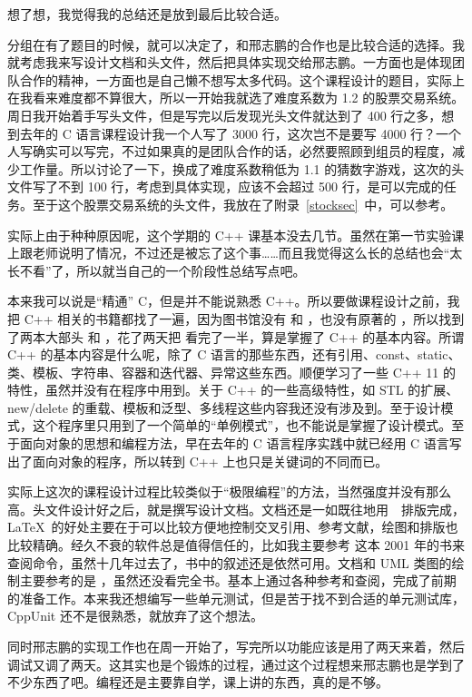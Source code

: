想了想，我觉得我的总结还是放到最后比较合适。

分组在有了题目的时候，就可以决定了，和邢志鹏的合作也是比较合适的选择。我就考虑我来写设计文档和头文件，然后把具体实现交给邢志鹏。一方面也是体现团队合作的精神，一方面也是自己懒不想写太多代码。这个课程设计的题目，实际上在我看来难度都不算很大，所以一开始我就选了难度系数为 1.2 的股票交易系统。周日我开始着手写头文件，但是写完以后发现光头文件就达到了 400 行之多，想到去年的 C 语言课程设计我一个人写了 3000 行，这次岂不是要写 4000 行？一个人写确实可以写完，不过如果真的是团队合作的话，必然要照顾到组员的程度，减少工作量。所以讨论了一下，换成了难度系数稍低为 1.1 的猜数字游戏，这次的头文件写了不到 100 行，考虑到具体实现，应该不会超过 500 行，是可以完成的任务。至于这个股票交易系统的头文件，我放在了附录~\ref{stocksec}~中，可以参考。

实际上由于种种原因呢，这个学期的 C++ 课基本没去几节。虽然在第一节实验课上跟老师说明了情况，不过还是被忘了这个事……而且我觉得这么长的总结也会“太长不看”了，所以就当自己的一个阶段性总结写点吧。

本来我可以说是“精通” C，但是并不能说熟悉 C++。所以要做课程设计之前，我把 C++ 相关的书籍都找了一遍，因为图书馆没有 \cite{cppp} 和 \cite{cpppp}，也没有原著的 \cite{cpplang}，所以找到了两本大部头 \cite{proc_c} 和 \cite{vc_c}，花了两天把 \cite{proc_c} 看完了一半，算是掌握了 C++ 的基本内容。所谓 C++ 的基本内容是什么呢，除了 C 语言的那些东西，还有引用、const、static、类、模板、字符串、容器和迭代器、异常这些东西。顺便学习了一些 C++ 11 的特性，虽然并没有在程序中用到。关于 C++ 的一些高级特性，如 STL 的扩展、new/delete 的重载、模板和泛型、多线程这些内容我还没有涉及到。至于设计模式，这个程序里只用到了一个简单的“单例模式”，也不能说是掌握了设计模式。至于面向对象的思想和编程方法，早在去年的 C 语言程序实践中就已经用 C 语言写出了面向对象的程序，所以转到 C++ 上也只是关键词的不同而已。

实际上这次的课程设计过程比较类似于“极限编程”的方法，当然强度并没有那么高。头文件设计好之后，就是撰写设计文档。文档还是一如既往地用~\LaTeXe~排版完成，\LaTeX~的好处主要在于可以比较方便地控制交叉引用、参考文献，绘图和排版也比较精确。经久不衰的软件总是值得信任的，比如我主要参考 \cite{latexdeng} 这本 2001 年的书来查阅命令，虽然十几年过去了，书中的叙述还是依然可用。文档和 UML 类图的绘制主要参考的是 \cite{apppc_c}，虽然还没看完全书。基本上通过各种参考和查阅，完成了前期的准备工作。本来我还想编写一些单元测试，但是苦于找不到合适的单元测试库，CppUnit 还不是很熟悉，就放弃了这个想法。

同时邢志鹏的实现工作也在周一开始了，写完所以功能应该是用了两天来着，然后调试又调了两天。这其实也是个锻炼的过程，通过这个过程想来邢志鹏也是学到了不少东西了吧。编程还是主要靠自学，课上讲的东西，真的是不够。

